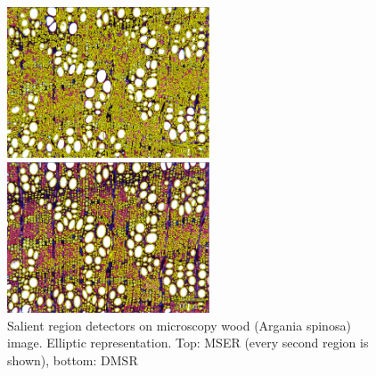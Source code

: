 \documentclass[conference,compsoc]{IEEEtran}
\begin{document}
 
\begin{figure}[htb]
\begin{minipage}[b]{.99\linewidth}
  \centering
  \centerline{\includegraphics[width=6cm]{mserWood}}
\end{minipage}
\hfill
\vspace{0.2cm}
\begin{minipage}[b]{0.99\linewidth}
  \centering
  \centerline{\includegraphics[width=6cm]{dmsrWood}}
\end{minipage}
\vspace{-0.1cm}
\caption{Salient region detectors on microscopy wood (Argania spinosa) image. Elliptic representation. Top: MSER (every second region is shown), bottom: DMSR}
\label{fig:wood}
\end{figure}
\end{document}
